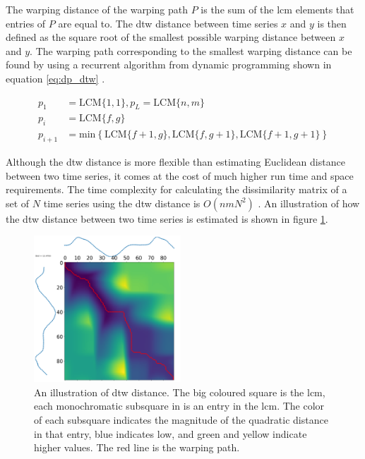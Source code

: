 The warping distance of the warping path $P$ is the sum of the \acrshort{lcm} elements that entries of $P$ are equal to. The \acrshort{dtw} distance between time series $x$ and $y$ is then defined as the square root of the smallest possible warping distance between $x$ and $y$. The warping path corresponding to the smallest warping distance can be found by using a recurrent algorithm from dynamic programming shown in equation \eqref{eq:dp_dtw} \cite{pjotr}.

\begin{equation}
    \begin{split}
        p_1     &= \mathrm{LCM}\{ 1,1 \}, p_L = \mathrm{LCM}\{ n,m \}  \\
        p_{i}   &= \mathrm{LCM}\{ f,g \} \\
        p_{i+1} &= \mathrm{min} \left \{ \mathrm{LCM} \{ f+1,g\}, \mathrm{LCM} \{ f,g+1\}, \mathrm{LCM} \{ f+1,g+1\} \right  \}
    \end{split}
    \label{eq:dp_dtw}
\end{equation}

Although the \acrshort{dtw} distance is more flexible than estimating Euclidean distance between two time series, it comes at the cost of much higher run time and space requirements. The time complexity for calculating the dissimilarity matrix of a set of $N$ time series using the \acrshort{dtw} distance is $O\left ( n m N^{2} \right )$ \cite{tsc_rev}. An illustration of how the \acrshort{dtw} distance between two time series is estimated is shown in figure \ref{fig:warping_path}. 

\begin{figure}
    \centering
    \includegraphics[width=0.49\textwidth]{machine-learning/warping_path_2_curves.png}
    \caption{An illustration of \acrshort{dtw} distance. The big coloured square is the \acrshort{lcm}, each monochromatic subsquare in is an entry in the \acrshort{lcm}. The color of each subsquare indicates the magnitude of the quadratic distance in that entry, blue indicates low, and green and yellow indicate higher values. The red line is the warping path.}
    \label{fig:warping_path}
\end{figure}

